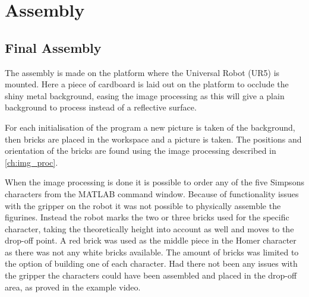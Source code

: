 \chapter{Assembly}


\section{Final Assembly}
%
%

The assembly is made on the platform where the Universal Robot (UR5) is mounted. Here a piece of cardboard is laid out on the platform to occlude the shiny metal background, easing the image processing as this will give a plain background to process instead of a reflective surface.

For each initialisation of the program a new picture is taken of the background, then bricks are placed in the workspace and a picture is taken. The positions and orientation of the bricks are found using the image processing described in \autoref{ch:img_proc}.

When the image processing is done it is possible to order any of the five Simpsons characters from the MATLAB command window. Because of functionality issues with the gripper on the robot it was not possible to physically assemble the figurines. Instead the robot marks the two or three bricks used for the specific character, taking the theoretically height into account as well and moves to the drop-off point. A red brick was used as the middle piece in the Homer character as there was not any white bricks available. The amount of bricks was limited to the option of building one of each character. Had there not been any issues with the gripper the characters could have been assembled and placed in the drop-off area, as proved in the example video.

